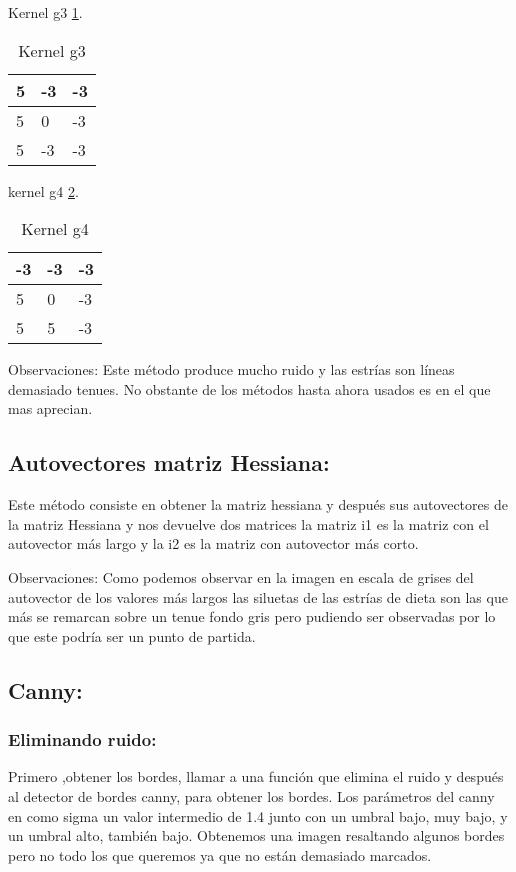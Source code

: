 Kernel g3 \ref{F_k6_3}.

\begin{table}[]
	\centering
	\caption{Kernel g3}
	\label{F_k6_3}
	\begin{tabular}{|l|l|l|}
		\hline
		5  & -3 & -3  \\ \hline
		5 & 0  & -3 \\ \hline
		5 & -3 & -3 \\ \hline
	\end{tabular}
\end{table}

kernel g4 \ref{F_k6_4}.

\begin{table}[]
	\centering
	\caption{Kernel g4}
	\label{F_k6_4}
	\begin{tabular}{|l|l|l|}
		\hline
		-3  & -3 & -3  \\ \hline
		5 & 0  & -3 \\ \hline
		5 & 5 & -3 \\ \hline
	\end{tabular}
\end{table}
Observaciones:
Este método produce mucho ruido y las estrías son líneas demasiado tenues.
No obstante de los métodos hasta ahora usados es en el que mas aprecian.

\subsection{Autovectores matriz Hessiana:}
Este método consiste en obtener la matriz hessiana y después sus autovectores de la matriz Hessiana y nos devuelve dos matrices la matriz i1 es la matriz con el autovector más largo y la i2 es la matriz con autovector más corto.





Observaciones: 
Como podemos observar en la imagen en escala de grises del autovector de los valores más largos las siluetas de las estrías de dieta son las que más se remarcan sobre un tenue fondo gris pero pudiendo ser observadas por lo que este podría ser un punto de partida.



\subsection{Canny:}

\subsubsection{Eliminando ruido:}
Primero ,obtener los bordes, llamar a una función que elimina el ruido y después al detector de bordes canny, para obtener los bordes.
Los parámetros del canny en como sigma un valor intermedio de 1.4 junto con un umbral bajo, muy bajo, y un umbral alto, también bajo.
Obtenemos una imagen resaltando algunos bordes pero no todo los que queremos ya que no están demasiado marcados.




